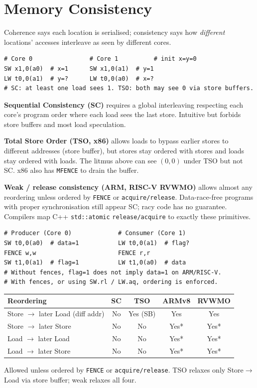 \section{Memory Consistency}\label{sec:consistency}
Coherence says each location is serialised; consistency says how \emph{different} locations' accesses interleave as seen by different cores.

\begin{lstlisting}[language={[x86masm]Assembler}, caption={Store-buffer litmus: SC forbids (0,0), TSO allows it.}, label={lst:litmus}]
# Core 0                # Core 1          # init x=y=0
SW x1,0(a0)  # x=1      SW x1,0(a1)  # y=1
LW t0,0(a1)  # y=?      LW t0,0(a0)  # x=?
# SC: at least one load sees 1. TSO: both may see 0 via store buffers.
\end{lstlisting}

\textbf{Sequential Consistency (SC)} requires a global interleaving respecting each core's program order where each load sees the last store. Intuitive but forbids store buffers and most load speculation.

\textbf{Total Store Order (TSO, x86)} allows loads to bypass earlier stores to different addresses (store buffer), but stores stay ordered with stores and loads stay ordered with loads. The litmus above can see $(0,0)$ under TSO but not SC. x86 also has \texttt{MFENCE} to drain the buffer.

\textbf{Weak / release consistency (ARM, RISC-V RVWMO)} allows almost any reordering unless ordered by \texttt{FENCE} or \texttt{acquire/release}. Data-race-free programs with proper synchronisation still appear SC; racy code has no guarantee. Compilers map C++ \texttt{std::atomic} \texttt{release/acquire} to exactly these primitives.

\begin{lstlisting}[language={[x86masm]Assembler}, caption={Fences restore ordering on weak model (RISC-V).}, label={lst:fence}]
# Producer (Core 0)             # Consumer (Core 1)
SW t0,0(a0)  # data=1           LW t0,0(a1)  # flag?
FENCE w,w                       FENCE r,r
SW t1,0(a1)  # flag=1           LW t1,0(a0)  # data
# Without fences, flag=1 does not imply data=1 on ARM/RISC-V.
# With fences, or using SW.rl / LW.aq, ordering is enforced.
\end{lstlisting}

\begin{center}
\begin{tabular}{lcccc}
\toprule Reordering & SC & TSO & ARMv8 & RVWMO \\ \midrule
Store $\to$ later Load (diff addr) & No & Yes (SB) & Yes & Yes \\
Store $\to$ later Store & No & No & Yes* & Yes* \\
Load $\to$ later Load & No & No & Yes* & Yes* \\
Load $\to$ later Store & No & No & Yes* & Yes* \\ \bottomrule
\end{tabular}
\end{center}
{\footnotesize *Allowed unless ordered by \texttt{FENCE} or \texttt{acquire/release}. TSO relaxes only Store$\to$Load via store buffer; weak relaxes all four.}

